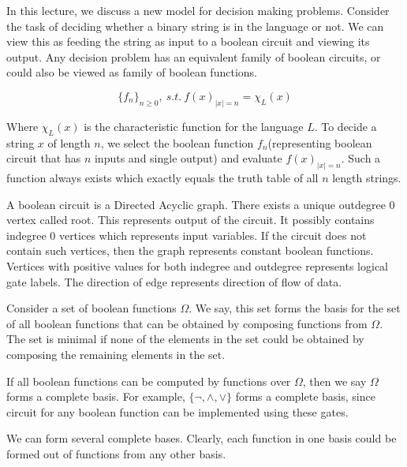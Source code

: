 

In this lecture, we discuss a new model for decision making problems. Consider the task of deciding whether a binary string is in the language or not. We can view this as feeding the string as input to a boolean circuit and viewing its output. Any decision problem has an equivalent family of boolean circuits, or could also be viewed as family of boolean functions.

\[
\{f_n\}_{n \geq 0}, \ s.t. \  f(x)_{|x|=n}=\chi _{L}(x)
\] 

Where $\chi _{L}(x)$ is the characteristic function for the language $L$. To decide a string $x$ of length $n$, we select the boolean function $f_n$(representing boolean circuit that has $n$ inputs and single output) and evaluate $f(x)_{|x|=n}$. Such a function always exists which exactly equals the truth table of all $n$ length strings.

\begin{definition}
A boolean circuit is a Directed Acyclic graph. There exists a unique outdegree 0 vertex called root. This represents output of the circuit. It possibly contains indegree 0 vertices which represents input variables. If the circuit does not contain such vertices, then the graph represents constant boolean functions. Vertices with positive values for both indegree and outdegree represents logical gate labels. The direction of edge represents direction of flow of data.
\end{definition}
Consider a set of boolean functions $\Omega$. We say, this set forms the basis for the set of all boolean functions that can be obtained by composing functions from $\Omega$. The set is minimal if none of the elements in the set could be obtained by composing the remaining elements in the set.

If all boolean functions can be computed by functions over $\Omega$, then we say $\Omega$ forms a complete basis. For example, $\{\neg,\wedge,\vee\}$ forms a complete basis, since circuit for any boolean function can be implemented using these gates. 

We can form several complete bases. Clearly, each function in one basis could be formed out of functions from any other basis. 

